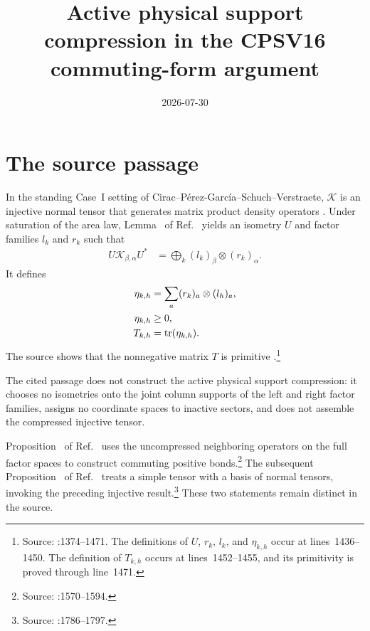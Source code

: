\documentclass{article}
\title{Active physical support compression in the CPSV16 commuting-form argument}
\author{}
\date{2026-07-30}
\begin{document}
\maketitle
{}

\section{The source passage}

In the standing Case~I setting of Cirac--P\'erez-Garc\'ia--Schuch--Verstraete,
$\mathcal K$ is an injective normal tensor that generates matrix product density
operators \cite{Cirac2016MPDO_arXiv}. Under saturation of the area law,
Lemma~ of Ref.~\cite{Cirac2016MPDO_arXiv} yields an isometry $U$
and factor families $l_k$ and $r_k$ such that
\begin{align}
    U\mathcal K_{\beta,\alpha}U^*
        &=
    \bigoplus_k (l_k)_\beta\otimes(r_k)_\alpha.
    \label{eq:cpsv16_active_physical_support_compression_sector_factorization}
\end{align}
It defines
\begin{align}
    \eta_{k,h}
        &=
    \sum_a (r_k)_a\otimes(l_h)_a,
    \label{eq:cpsv16_active_physical_support_compression_neighboring_operator}\\
    \eta_{k,h}
        &\geq 0,
    \label{eq:cpsv16_active_physical_support_compression_neighboring_positivity}\\
    T_{k,h}
        &=
    \operatorname{tr}(\eta_{k,h}).
    \label{eq:cpsv16_active_physical_support_compression_transition_matrix}
\end{align}
The source shows that the nonnegative matrix $T$ is primitive
\cite{Cirac2016MPDO_arXiv}.\footnote{Source:
:1374--1471. The definitions of
$U$, $r_k$, $l_k$, and $\eta_{k,h}$ occur at lines~1436--1450. The definition
of $T_{k,h}$ occurs at lines~1452--1455, and its primitivity is proved through
line~1471.}

The cited passage does not construct the active physical support compression:
it chooses no isometries onto the joint column supports of the left and right
factor families, assigns no coordinate spaces to inactive sectors, and does
not assemble the compressed injective tensor.

Proposition~ of Ref.~\cite{Cirac2016MPDO_arXiv} uses the
uncompressed neighboring operators on the full factor spaces to construct
commuting positive bonds.\footnote{Source:
:1570--1594.}
The subsequent Proposition~ of
Ref.~\cite{Cirac2016MPDO_arXiv} treats a simple tensor with a basis of normal
tensors, invoking the preceding injective result.\footnote{Source:
:1786--1797.}
These two statements remain distinct in the source.
\end{document}
